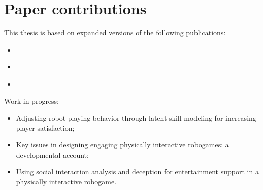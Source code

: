 \section{Paper contributions}

This thesis is based on expanded versions of the following publications:

\begin{itemize}
    \item \cite{oliveira_learning_2018}
    \item \cite{oliveira_modeling_2017}
    \item \cite{oliveira_activity_2017}
\end{itemize}

Work in progress:

\begin{itemize}
\item Adjusting robot playing behavior through latent skill modeling for increasing player satisfaction;
\item Key issues in designing engaging physically interactive robogames: a developmental account;
\item Using social interaction analysis and deception for entertainment support in a physically interactive robogame.
\end{itemize}